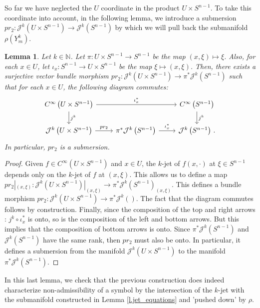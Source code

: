 \documentclass[10pt,twoside]{article}
\newcommand{\N}{\mathbb{N}}
\newcommand{\calJ}{\mathcal{J}}
\numberwithin{theorem}{section}
\newtheorem{lemma}[theorem]{Lemma}
\begin{document}
So far we have neglected the $U$ coordinate in the product $U\times S^{n-1}$. To take this coordinate into account, in the following lemma, we introduce a submersion $pr_2:\calJ^k\left(U\times S^{n-1}\right)\rightarrow \calJ^k\left(S^{n-1}\right)$ by which we will pull back the submanifold $\rho\left(Y^k_m\right)$.
\begin{lemma}\label{l.jets_back_home}
Let $k\in\N$. Let $\pi: U\times S^{n-1}\rightarrow S^{n-1}$ be the map $(x,\xi)\mapsto \xi$. Also, for each $x\in U$, let $\iota_x:S^{n-1}\rightarrow U\times S^{n-1}$ be the map $\xi\mapsto (x,\xi)$. Then, there exists a surjective vector bundle morphism $pr_2:\calJ^k\left(U\times S^{n-1}\right)\rightarrow\pi^*\calJ^k\left(S^{n-1}\right)$ such that for each $x\in U$, the following diagram commutes:
\[
\begin{tikzcd}
C^\infty\left(U\times S^{n-1}\right)\arrow{rr}{\iota_x^*} \arrow{d}{j^k} & & C^\infty\left(S^{n-1}\right) \arrow{d}{j^k}\\
\calJ^k\left(U\times S^{n-1}\right)\arrow{r}{pr_2} & \pi^*\calJ^k\left(S^{n-1}\right)\arrow{r}{\iota_x^*} & \calJ^k\left(S^{n-1}\right)\, .
\end{tikzcd}
\]
In particular, $pr_2$ is a submersion.
\end{lemma}
\begin{proof}
Given $f\in C^\infty\left(U\times S^{n-1}\right)$ and $x\in U$, the $k$-jet of $f(x,\cdot)$ at $\xi\in S^{n-1}$ depends only on the $k$-jet of $f$ at $(x,\xi)$. This allows us to define a map $pr_2|_{(x,\xi)}:\calJ^k\left(U\times S^{n-1}\right)|_{(x,\xi)}\rightarrow\pi^*\calJ^k\left(S^{n-1}\right)_{(x,\xi)}$. This defines a bundle morphism $pr_2:\calJ^k\left(U\times S^{n-1}\right)\rightarrow\pi^*\calJ^k\left(\right)$. The fact that the diagram commutes follows by construction. Finally, since the composition of the top and right arrows : $j^k\circ\iota_x^*$ is onto, so is the composition of the left and bottom arrows. But this implies that the composition of bottom arrows is onto. Since $\pi^*\calJ^k\left(S^{n-1}\right)$ and $\calJ^k\left(S^{n-1}\right)$ have the same rank, then $pr_2$ must also be onto. In particular, it defines a submersion from the manifold $\calJ^k\left(U\times S^{n-1}\right)$ to the manifold $\pi^*\calJ^k\left(S^{n-1}\right)$.
\end{proof}

In this last lemma, we check that the previous construction does indeed characterize non-admissibility of a symbol by the intersection of the $k$-jet with the submanifold constructed in Lemma \ref{l.jet_equations} and 'pushed down' by $\rho$.
\end{document}
